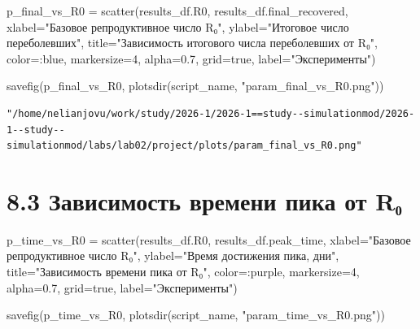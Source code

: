 \documentclass[
  12pt,
  a4paper,
  DIV=11,
  numbers=noendperiod]{scrreprt}
\newenvironment{Shaded}{\begin{snugshade}}{\end{snugshade}}
\newcommand{\ConstantTok}[1]{\textcolor[rgb]{0.56,0.35,0.01}{#1}}
\newcommand{\FloatTok}[1]{\textcolor[rgb]{0.68,0.00,0.00}{#1}}
\newcommand{\FunctionTok}[1]{\textcolor[rgb]{0.28,0.35,0.67}{#1}}
\newcommand{\NormalTok}[1]{\textcolor[rgb]{0.00,0.23,0.31}{#1}}
\newcommand{\OperatorTok}[1]{\textcolor[rgb]{0.37,0.37,0.37}{#1}}
\newcommand{\StringTok}[1]{\textcolor[rgb]{0.13,0.47,0.30}{#1}}
\begin{document}
\begin{Shaded}
\begin{Highlighting}[]
\NormalTok{p\_final\_vs\_R0 }\OperatorTok{=} \FunctionTok{scatter}\NormalTok{(results\_df.R0, results\_df.final\_recovered,}
\NormalTok{    xlabel}\OperatorTok{=}\StringTok{"Базовое репродуктивное число R₀"}\NormalTok{,}
\NormalTok{    ylabel}\OperatorTok{=}\StringTok{"Итоговое число переболевших"}\NormalTok{,}
\NormalTok{    title}\OperatorTok{=}\StringTok{"Зависимость итогового числа переболевших от R₀"}\NormalTok{,}
\NormalTok{    color}\OperatorTok{=:}\NormalTok{blue,}
\NormalTok{    markersize}\OperatorTok{=}\FloatTok{4}\NormalTok{,}
\NormalTok{    alpha}\OperatorTok{=}\FloatTok{0.7}\NormalTok{,}
\NormalTok{    grid}\OperatorTok{=}\ConstantTok{true}\NormalTok{,}
\NormalTok{    label}\OperatorTok{=}\StringTok{"Эксперименты"}\NormalTok{)}

\FunctionTok{savefig}\NormalTok{(p\_final\_vs\_R0, }\FunctionTok{plotsdir}\NormalTok{(script\_name, }\StringTok{"param\_final\_vs\_R0.png"}\NormalTok{))}
\end{Highlighting}
\end{Shaded}

\begin{verbatim}
"/home/nelianjovu/work/study/2026-1/2026-1==study--simulationmod/2026-1--study--simulationmod/labs/lab02/project/plots/param_final_vs_R0.png"
\end{verbatim}

\section{8.3 Зависимость времени пика от
R₀}\label{ux437ux430ux432ux438ux441ux438ux43cux43eux441ux442ux44c-ux432ux440ux435ux43cux435ux43dux438-ux43fux438ux43aux430-ux43eux442-rux2080}

\begin{Shaded}
\begin{Highlighting}[]
\NormalTok{p\_time\_vs\_R0 }\OperatorTok{=} \FunctionTok{scatter}\NormalTok{(results\_df.R0, results\_df.peak\_time,}
\NormalTok{    xlabel}\OperatorTok{=}\StringTok{"Базовое репродуктивное число R₀"}\NormalTok{,}
\NormalTok{    ylabel}\OperatorTok{=}\StringTok{"Время достижения пика, дни"}\NormalTok{,}
\NormalTok{    title}\OperatorTok{=}\StringTok{"Зависимость времени пика от R₀"}\NormalTok{,}
\NormalTok{    color}\OperatorTok{=:}\NormalTok{purple,}
\NormalTok{    markersize}\OperatorTok{=}\FloatTok{4}\NormalTok{,}
\NormalTok{    alpha}\OperatorTok{=}\FloatTok{0.7}\NormalTok{,}
\NormalTok{    grid}\OperatorTok{=}\ConstantTok{true}\NormalTok{,}
\NormalTok{    label}\OperatorTok{=}\StringTok{"Эксперименты"}\NormalTok{)}

\FunctionTok{savefig}\NormalTok{(p\_time\_vs\_R0, }\FunctionTok{plotsdir}\NormalTok{(script\_name, }\StringTok{"param\_time\_vs\_R0.png"}\NormalTok{))}
\end{Highlighting}
\end{Shaded}
\end{document}
